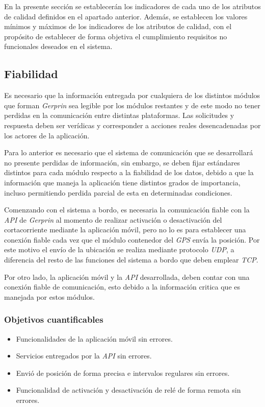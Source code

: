 En la presente sección se establecerán los indicadores de cada uno de los atributos de calidad definidos en el apartado anterior. Además, se establecen los valores mínimos y máximos de los indicadores de los atributos de calidad, con el propósito de establecer de forma objetiva el cumplimiento requisitos no funcionales deseados en el sistema.

\subsection{Fiabilidad}

Es necesario que la información entregada por cualquiera de los distintos módulos que forman \textit{Gerprin} sea legible por los módulos restantes y de este modo no tener perdidas en la comunicación entre distintas plataformas. Las solicitudes y respuesta deben ser verídicas y corresponder a acciones reales desencadenadas por los actores de la aplicación.

Para lo anterior es necesario que el sistema de comunicación que se desarrollará no presente perdidas de información, sin embargo, se deben fijar estándares distintos para cada módulo respecto a la fiabilidad de los datos, debido a que la información que maneja la aplicación tiene distintos grados de importancia, incluso permitiendo perdida parcial de esta en determinadas condiciones.

Comenzando con el sistema a bordo, es necesaria la comunicación fiable con la \textit{API} de \textit{Gerprin} al momento de realizar activación o desactivación del cortacorriente mediante la aplicación móvil, pero no lo es para establecer una conexión fiable cada vez que el módulo contenedor del \textit{GPS} envía la posición. Por este motivo el envío de la ubicación se realiza mediante protocolo \textit{UDP}, a diferencia del resto de las funciones del sistema a bordo que deben emplear \textit{TCP}.

Por otro lado, la aplicación móvil y la \textit{API} desarrollada, deben contar con una conexión fiable de comunicación, esto debido a la información critica que es manejada por estos módulos.

\subsubsection{Objetivos cuantificables}

\begin{itemize}
	\item
	Funcionalidades de la aplicación móvil sin errores.
	\item
	Servicios entregados por la \textit{API} sin errores.
	\item
	Envió de posición de forma precisa e intervalos regulares sin errores.
	\item
	Funcionalidad de activación y desactivación de relé de forma remota sin errores.
\end{itemize}

